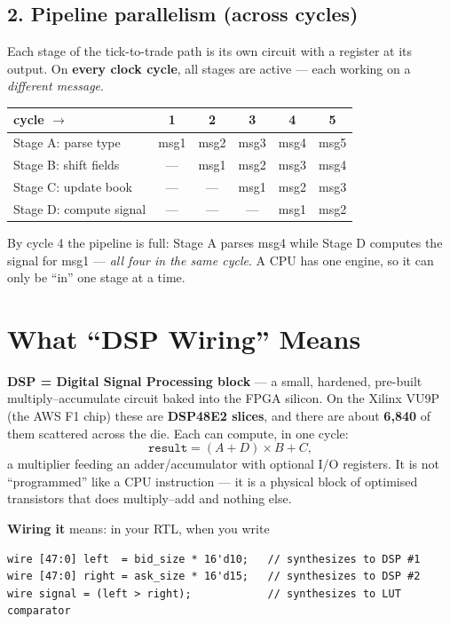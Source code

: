 \documentclass[11pt,a4paper]{article}
\begin{document}
\subsection*{2. Pipeline parallelism (across cycles)}

Each stage of the tick-to-trade path is its own circuit with a register at its output.
On \textbf{every clock cycle}, all stages are active --- each working on a
\emph{different message}.

\begin{center}
\begin{tabular}{l|ccccc}
\toprule
\textbf{cycle} $\rightarrow$ & 1 & 2 & 3 & 4 & 5 \\
\midrule
Stage A: parse type     & msg1 & msg2 & msg3 & msg4 & msg5 \\
Stage B: shift fields    & ---  & msg1 & msg2 & msg3 & msg4 \\
Stage C: update book     & ---  & ---  & msg1 & msg2 & msg3 \\
Stage D: compute signal  & ---  & ---  & ---  & msg1 & msg2 \\
\bottomrule
\end{tabular}
\end{center}

By cycle 4 the pipeline is full: Stage A parses msg4 while Stage D computes the signal
for msg1 --- \emph{all four in the same cycle}. A CPU has one engine, so it can only be
``in'' one stage at a time.

\section{What ``DSP Wiring'' Means}

\textbf{DSP = Digital Signal Processing block} --- a small, hardened, pre-built
multiply--accumulate circuit baked into the FPGA silicon. On the Xilinx VU9P (the AWS F1
chip) these are \textbf{DSP48E2 slices}, and there are about \textbf{6{,}840} of them
scattered across the die. Each can compute, in one cycle:
\[
  \texttt{result} = (A + D)\times B + C,
\]
a multiplier feeding an adder/accumulator with optional I/O registers. It is not
``programmed'' like a CPU instruction --- it is a physical block of optimised transistors
that does multiply--add and nothing else.

\textbf{Wiring it} means: in your RTL, when you write

\begin{lstlisting}
wire [47:0] left  = bid_size * 16'd10;   // synthesizes to DSP #1
wire [47:0] right = ask_size * 16'd15;   // synthesizes to DSP #2
wire signal = (left > right);            // synthesizes to LUT comparator
\end{lstlisting}
\end{document}
